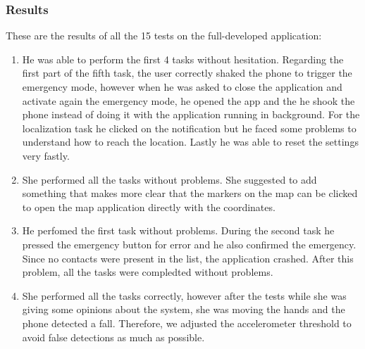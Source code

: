 \documentclass[12pt]{article}
\begin{document}
\subsubsection{Results}
These are the results of all the 15 tests on the full-developed application:
\begin{enumerate}
    \item He was able to perform the first 4 tasks without hesitation. 
    Regarding the first part of the fifth task, the user correctly shaked 
    the phone to trigger the emergency mode, however when he was asked to 
    close the application and activate again the emergency mode, he opened 
    the app and the he shook the phone instead of doing it with the 
    application running in background. For the localization task he clicked on the 
    notification but he faced some problems to understand how to reach the 
    location. Lastly he was able to reset the settings very fastly. 

    \item She performed all the tasks without problems. She suggested to 
    add something that makes more clear that the markers on the map can 
    be clicked to open the map application directly with the coordinates. 

    \item He perfomed the first task without problems. During the second 
    task he pressed the emergency button for error and he also confirmed 
    the emergency. Since no contacts were present in the list, the application 
    crashed. After this problem, all the tasks were compledted without problems. 

    \item She performed all the tasks correctly, however after the tests 
    while she was giving some opinions about the system, she was moving the 
    hands and the phone detected a fall. Therefore, we adjusted the 
    accelerometer threshold to avoid false detections as much as possible.  
\end{enumerate}
\end{document}
